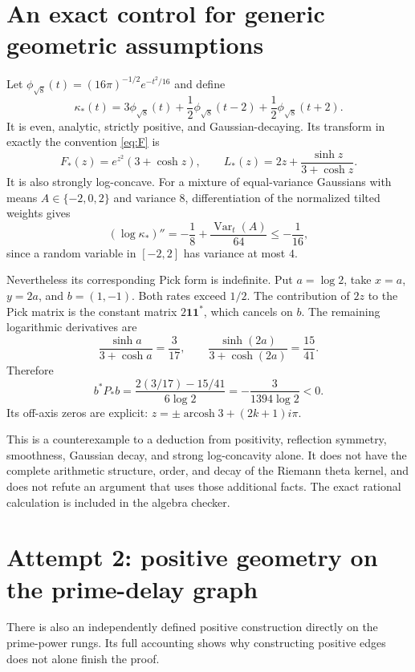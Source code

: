 \documentclass[11pt,letterpaper]{article}
\theoremstyle{remark}\newtheorem{remark}[theorem]{Remark}
\numberwithin{equation}{section}
\begin{document}
\section{An exact control for generic geometric assumptions}\label{sec:control}

Let $\phi_{\sqrt8}(t)=(16\pi)^{-1/2}e^{-t^2/16}$ and define
\begin{equation}\label{eq:mixture}
\kappa_*(t)=3\phi_{\sqrt8}(t)+
\frac12\phi_{\sqrt8}(t-2)+\frac12\phi_{\sqrt8}(t+2).
\end{equation}
It is even, analytic, strictly positive, and Gaussian-decaying. Its transform in exactly the convention \eqref{eq:F} is
\[
F_*(z)=e^{z^2}(3+\cosh z),\qquad
L_*(z)=2z+\frac{\sinh z}{3+\cosh z}.
\]
It is also strongly log-concave. For a mixture of equal-variance Gaussians with means $A\in\{-2,0,2\}$ and variance $8$, differentiation of the normalized tilted weights gives
\[
(\log\kappa_*)''=-\frac18+\frac{\operatorname{Var}_t(A)}{64}
\le-\frac1{16},
\]
since a random variable in $[-2,2]$ has variance at most $4$.

Nevertheless its corresponding Pick form is indefinite. Put $a=\log2$, take $x=a$, $y=2a$, and $b=(1,-1)$. Both rates exceed $1/2$. The contribution of $2z$ to the Pick matrix is the constant matrix $2\mathbf1\mathbf1^*$, which cancels on $b$. The remaining logarithmic derivatives are
\[
\frac{\sinh a}{3+\cosh a}=\frac3{17},\qquad
\frac{\sinh(2a)}{3+\cosh(2a)}=\frac{15}{41}.
\]
Therefore
\begin{equation}\label{eq:negativecontrol}
\boxed{b^*P_*b=\frac{2(3/17)-15/41}{6\log2}
=-\frac3{1394\log2}<0.}
\end{equation}
Its off-axis zeros are explicit: $z=\pm\operatorname{arcosh}3+(2k+1)i\pi$.

This is a counterexample to a deduction from positivity, reflection symmetry, smoothness, Gaussian decay, and strong log-concavity alone. It does not have the complete arithmetic structure, order, and decay of the Riemann theta kernel, and does not refute an argument that uses those additional facts. The exact rational calculation is included in the algebra checker.

\section{Attempt 2: positive geometry on the prime-delay graph}

There is also an independently defined positive construction directly on the prime-power rungs. Its full accounting shows why constructing positive edges does not alone finish the proof.
\end{document}
